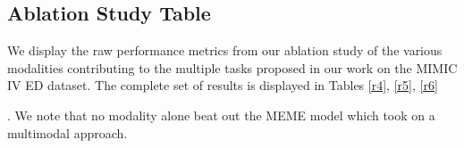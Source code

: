 \documentclass[pmlr]{jmlr}%
\begin{document}
{%




\subsection{Ablation Study Table}
\label{ablation}

We display the raw performance metrics from our ablation study of the various modalities contributing to the multiple tasks proposed in our work on the MIMIC IV ED dataset. The complete set of results is displayed in Tables \ref{r4}, \ref{r5}, \ref{r6}}. We note that no modality alone beat out the MEME model which took on a multimodal approach. 
\end{document}
